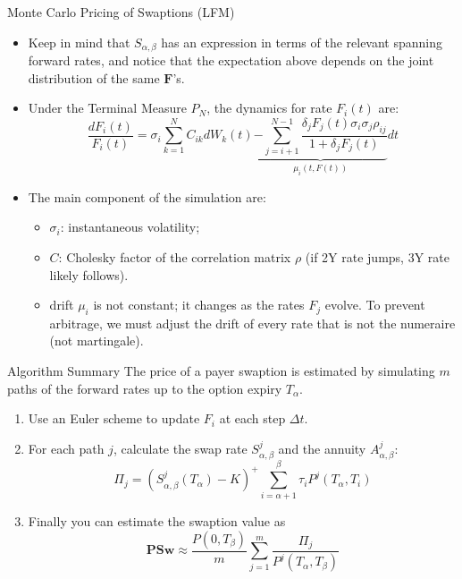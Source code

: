 \documentclass{beamer}
\begin{document}
\begin{frame}{Monte Carlo Pricing of Swaptions (LFM)}
	\begin{itemize}
		\item<1-> Keep in mind that $S_{\alpha,\beta}$ has an expression in terms of the relevant spanning forward rates, and notice that the expectation above depends on the joint distribution of the same $\bm{F}$’s.
		\item Under the Terminal Measure $P_N$, the dynamics for rate $F_i(t)$ are:
		\begin{equation*}
			\frac{dF_i(t)}{F_i(t)} =\sigma_i \sum_{k=1}^N C_{ik} dW_k(t) \underbrace{-\sum_{j=i+1}^{N-1} \frac{\delta_j F_j(t) \sigma_i \sigma_j \rho_{ij}}{1 + \delta_j F_j(t)}}_{\mu_i(t, F(t))}dt
		\end{equation*}
		\item The main component of the simulation are:
		\begin{itemize}
			\item $\sigma_i$: instantaneous volatility;
			\item $C$: Cholesky factor of the correlation matrix $\rho$ (if 2Y rate jumps, 3Y rate likely follows).
			\item drift $\mu_i$ is not constant; it changes as the rates $F_j$ evolve. To prevent arbitrage, we must adjust the drift of every rate that is not the numeraire (not martingale).
		\end{itemize}
	\end{itemize}
\end{frame}

\begin{frame}{Algorithm Summary}
	The price of a payer swaption is estimated by simulating $m$ paths of the forward rates up to the option expiry $T_\alpha$.

	\begin{enumerate}
		\item Use an Euler scheme to update $F_i$ at each step $\Delta t$.
		\item For each path $j$, calculate the swap rate $S_{\alpha,\beta}^j$ and the annuity $A_{\alpha,\beta}^j$:
		\[ \Pi_j = (S_{\alpha,\beta}^j(T_\alpha) - K)^+ \sum_{i=\alpha+1}^\beta \tau_i P^j(T_\alpha, T_i) \]
		\item Finally you can estimate the swaption value as
		\begin{equation*}
			\mathbf{PSw} \approx \frac{P(0, T_\beta)}{m} \sum_{j=1}^m \frac{\Pi_j}{P^j(T_\alpha, T_\beta)}
		\end{equation*}
	\end{enumerate}
\end{frame}
\end{document}
